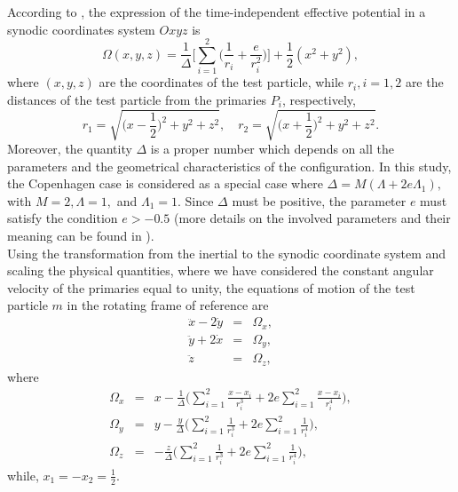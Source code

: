 \documentclass[preprint,fleqn,5p,numbers,sort&compress]{elsarticle}
\begin{document}
According to \cite{fak17}, the expression of the time-independent effective potential in a synodic coordinates system $Oxyz$ is
\begin{equation}\label{Eq:1}
\Omega(x, y, z)=\frac{1}{\Delta}\Big[\sum_{i=1}^{2}\Big(\frac{1}{r_i}+\frac{e}{r_i^2}\Big)\Big]+\frac{1}{2}(x^2+y^2),
\end{equation}
where $(x,y,z)$ are the coordinates of the test particle, while $r_i, i=1,2$ are the distances of the test particle from the primaries $P_i$, respectively,
\begin{equation}
  r_1 = \sqrt{\Big(x-\frac{1}{2}\Big)^2+y^2+z^2},\quad
  r_2 = \sqrt{\Big(x+\frac{1}{2}\Big)^2+y^2+z^2}.\nonumber
\end{equation}
Moreover, the quantity $\Delta$ is a proper number which depends on all the parameters and the geometrical characteristics of the configuration. In this study, the Copenhagen case is considered as a special case where $\Delta=M(\Lambda+2e\Lambda_1),$ with $M=2, \Lambda=1,$ and $\Lambda_1=1$. Since $\Delta$ must be positive, the parameter $e$ must satisfy the condition $e>-0.5$ (more details on the involved parameters and their meaning can be found in \cite{fak17}).\\
Using the transformation from the inertial to the synodic coordinate system and scaling the physical quantities, where we have considered the constant angular velocity of the primaries equal to unity, the equations of motion of the test particle $m$ in the rotating frame of reference are
\begin{subequations}
\begin{eqnarray}
\label{Eq:2a}
\ddot{x}-2\dot{y}&=&\Omega_x,\\
\label{Eq:2b}
\ddot{y}+2\dot{x}&=&\Omega_y,\\
\label{Eq:2c}
\ddot{z}&=&\Omega_z,
\end{eqnarray}
\end{subequations}
where
\begin{subequations}
\begin{eqnarray}
\label{Eq:3a}
\Omega_x &=&  x-\frac{1}{\Delta}\Big(\sum_{i=1}^2\frac{x-x_i}{r_i^3}+2e\sum_{i=1}^2\frac{x-x_i}{r_i^4}\Big),\\
\label{Eq:3b}
\Omega_y &=&  y-\frac{y}{\Delta}\Big(\sum_{i=1}^2\frac{1}{r_i^3}+2e\sum_{i=1}^2\frac{1}{r_i^4}\Big),\\
\label{Eq:3c}
\Omega_z &=&  -\frac{z}{\Delta}\Big(\sum_{i=1}^2\frac{1}{r_i^3}+2e\sum_{i=1}^2\frac{1}{r_i^4}\Big),
\end{eqnarray}
\end{subequations}
while, $x_1=-x_2=\frac{1}{2}$.
\end{document}
